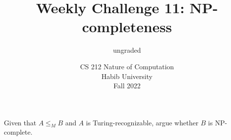 \documentclass[a4paper]{exam}
\title{Weekly Challenge 11: NP-completeness}
\author{ungraded} %
\date{CS 212 Nature of Computation\\Habib University\\Fall 2022}
\begin{document}
\maketitle

\begin{questions}
  

  Given that $A \leq_M B$ and $A$ is Turing-recognizable, argue whether $B$ is NP-complete.

  \begin{solution}
  \end{solution}
\end{questions}
\end{document}

